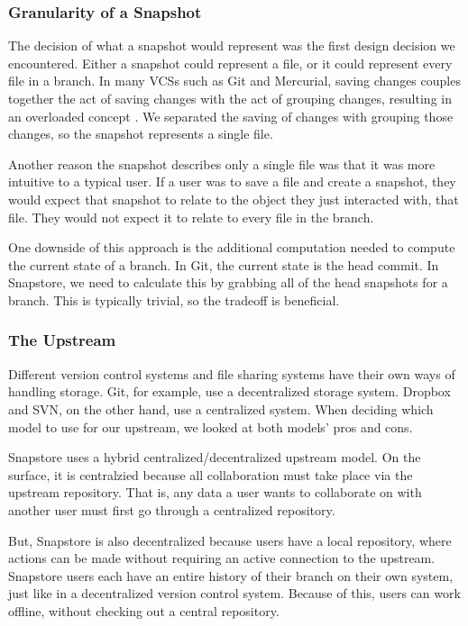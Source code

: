 \subsubsection{Granularity of a Snapshot}

The decision of what a snapshot would represent was the first design decision we encountered. Either a snapshot could represent a file, or it could represent every file in a branch. In many VCSs such as Git and Mercurial, saving changes couples together the act of saving changes with the act of grouping changes, resulting in an overloaded concept \cite{Jackson}. We separated the saving of changes with grouping those changes, so the snapshot represents a single file.

Another reason the snapshot describes only a single file was that it was more intuitive to a typical user. If a user was to save a file and create a snapshot, they would expect that snapshot to relate to the object they just interacted with, that file. They would not expect it to relate to every file in the branch.

One downside of this approach is the additional computation needed to compute the current state of a branch. In Git, the current state is the head commit. In Snapstore, we need to calculate this by grabbing all of the head snapshots for a branch. This is typically trivial, so the tradeoff is beneficial.

\subsubsection{The Upstream}

Different version control systems and file sharing systems have their own ways of handling storage. Git, for example, use a decentralized storage system. Dropbox and SVN, on the other hand, use a centralized system. When deciding which model to use for our upstream, we looked at both models' pros and cons.

Snapstore uses a hybrid centralized/decentralized upstream model. On the surface, it is centralzied because all collaboration must take place via the upstream repository. That is, any data a user wants to collaborate on with another user must first go through a centralized repository.

But, Snapstore is also decentralized because users have a local repository, where actions can be made without requiring an active connection to the upstream. Snapstore users each have an entire history of their branch on their own system, just like in a decentralized version control system. Because of this, users can work offline, without checking out a central repository.

